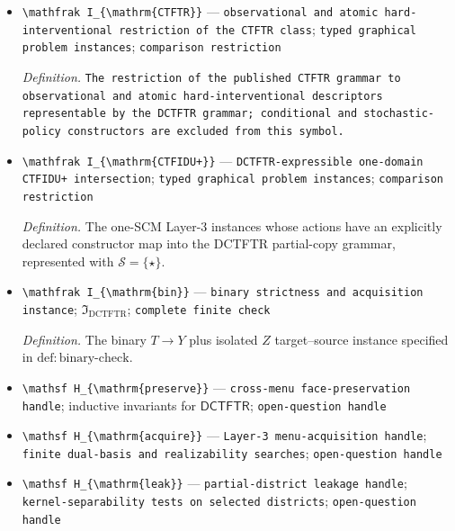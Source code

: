 \documentclass{article}
\begin{document}
\begin{itemize}
  \item \texttt{\textbackslash{}\allowbreak{}mathfrak I\_\allowbreak{}\{\textbackslash{}\allowbreak{}mathrm\{CTFTR\}\allowbreak{}\}\allowbreak{}} --- \texttt{observational and atomic hard-\allowbreak{}interventional restriction of the CTFTR class}; \texttt{typed graphical problem instances}; \texttt{comparison restriction}
  \par\smallskip\noindent\emph{Definition.} \texttt{The restriction of the published CTFTR grammar to observational and atomic hard-\allowbreak{}interventional descriptors representable by the DCTFTR grammar;\allowbreak{} conditional and stochastic-\allowbreak{}policy constructors are excluded from this symbol.}
  \item \texttt{\textbackslash{}\allowbreak{}mathfrak I\_\allowbreak{}\{\textbackslash{}\allowbreak{}mathrm\{CTFIDU+\allowbreak{}\}\allowbreak{}\}\allowbreak{}} --- \texttt{DCTFTR-\allowbreak{}expressible one-\allowbreak{}domain CTFIDU+\allowbreak{} intersection}; \texttt{typed graphical problem instances}; \texttt{comparison restriction}
  \par\smallskip\noindent\emph{Definition.} The one-SCM Layer-3 instances whose actions have an explicitly declared constructor map into the DCTFTR partial-copy grammar, represented with \(\mathcal S=\{\star\}\).
  \item \texttt{\textbackslash{}\allowbreak{}mathfrak I\_\allowbreak{}\{\textbackslash{}\allowbreak{}mathrm\{bin\}\allowbreak{}\}\allowbreak{}} --- \texttt{binary strictness and acquisition instance}; \(\mathfrak I_{\mathrm{DCTFTR}}\); \texttt{complete finite check}
  \par\smallskip\noindent\emph{Definition.} The binary \(T\to Y\) plus isolated \(Z\) target--source instance specified in \(\mathrm{def:binary\text{-}check}\).
  \item \texttt{\textbackslash{}\allowbreak{}mathsf H\_\allowbreak{}\{\textbackslash{}\allowbreak{}mathrm\{preserve\}\allowbreak{}\}\allowbreak{}} --- \texttt{cross-\allowbreak{}menu face-\allowbreak{}preservation handle}; inductive invariants for \(\mathsf{DCTFTR}\); \texttt{open-\allowbreak{}question handle}
  \item \texttt{\textbackslash{}\allowbreak{}mathsf H\_\allowbreak{}\{\textbackslash{}\allowbreak{}mathrm\{acquire\}\allowbreak{}\}\allowbreak{}} --- \texttt{Layer-\allowbreak{}3 menu-\allowbreak{}acquisition handle}; \texttt{finite dual-\allowbreak{}basis and realizability searches}; \texttt{open-\allowbreak{}question handle}
  \item \texttt{\textbackslash{}\allowbreak{}mathsf H\_\allowbreak{}\{\textbackslash{}\allowbreak{}mathrm\{leak\}\allowbreak{}\}\allowbreak{}} --- \texttt{partial-\allowbreak{}district leakage handle}; \texttt{kernel-\allowbreak{}separability tests on selected districts}; \texttt{open-\allowbreak{}question handle}

\end{itemize}
\end{document}

